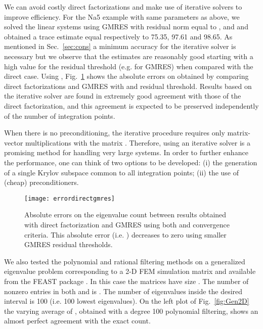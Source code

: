 \documentclass[12pt]{article}		\usepackage{tabls,multirow}
\begin{document}
We can avoid costly direct factorizations and make use of iterative
solvers to improve efficiency. For the Na5 example with same
parameters as above, we solved the linear systems using GMRES with
residual norm equal to ,  and  and obtained
a trace estimate equal respectively to 75.35, 97.61 and 98.65.  As
mentioned in Sec.~\ref{sec:cons} a minimum accuracy for the iterative
solver is necessary but we observe that the estimates are reasonably
good starting with a high value for the residual threshold
(e.g.  for GMRES) when compared with the direct case. Using
, Fig.~\ref{fig:errordirectgmres} shows the absolute errors on
 obtained by comparing direct factorizations and GMRES with
 and  residual threshold. Results based on the
iterative solver are found in extremely good agreement with those of
the direct factorization, and this agreement is expected to be
preserved independently of the number of integration points.

When there is no preconditioning, the iterative procedure requires
only matrix-vector multiplications with the matrix . Therefore,
using an iterative solver is a promising method for handling very
large systems. In order to further enhance the performance, one can
think of two options to be developed: (i) the generation of a single
Krylov subspace common to all integration points; (ii) the use of
(cheap) preconditioners.

\begin{figure}[hbt]
\centerline{ 
\texttt{[image: errordirectgmres]}} 
\caption{Absolute 
errors on the eigenvalue count between results obtained with direct factorization and 
GMRES using both  and  convergence criteria. 
This absolute error (i.e. ) decreases to zero
using smaller GMRES residual thresholds.
\label{fig:errordirectgmres}}
\end{figure}

We also tested the polynomial and rational filtering methods on a
generalized eigenvalue problem corresponding to a 2-D FEM simulation
matrix and available from the FEAST package \cite{FEASTsolver}.  In
this case the matrices  have size . The number of
nonzero entries in both  and  is .  The number of
eigenvalues inside the desired interval is 100 (i.e. 100 lowest
eigenvalues).  On the left plot of Fig.~\ref{fig:Gen2D} the varying
average of , obtained with a degree 100 polynomial
filtering, shows an almost perfect agreement with the exact count.
\end{document}
